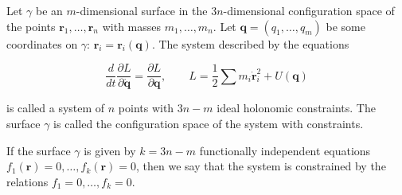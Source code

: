 Let $\gamma$ be an $m$-dimensional surface in the $3n$-dimensional configuration space of the points $\mathbf{r}_1, \ldots, \mathbf{r}_n$ with masses $m_1, \ldots, m_n$. Let $\mathbf{q} = (q_1, \ldots, q_m)$ be some coordinates on $\gamma$:
$\mathbf{r}_i = \mathbf{r}_i(\mathbf{q})$. The system described by the equations

$$\frac{d}{dt} \frac{\partial L}{\partial \dot{\mathbf{q}}} = \frac{\partial L}{\partial \mathbf{q}}, \qquad L = \frac{1}{2} \sum m_i \dot{\mathbf{r}}_i^2 + U(\mathbf{q})$$

is called a system of $n$ points with $3n - m$ ideal holonomic constraints. The surface $\gamma$ is called the configuration space of the system with constraints.

If the surface $\gamma$ is given by $k = 3n - m$ functionally independent equations $f_1(\mathbf{r}) = 0, \ldots, f_k(\mathbf{r}) = 0$, then we say that the system is constrained by the relations $f_1 = 0, \ldots, f_k = 0$.
